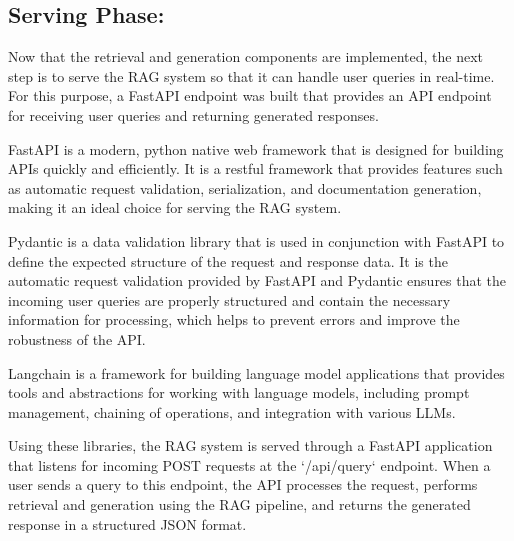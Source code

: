 ﻿\documentclass{article}
\begin{document}
\subsection{Serving Phase:}

Now that the retrieval and generation components are implemented, 
the next step is to serve the RAG system so that it can handle user queries in real-time.
For this purpose, a FastAPI endpoint was built that provides an API endpoint for receiving user queries and returning generated responses.

FastAPI is a modern, python native web framework that is designed for building APIs quickly and efficiently.
It is a restful framework that provides features such as automatic request validation, serialization, and documentation generation, making it an ideal choice for serving the RAG system.

Pydantic is a data validation library that is used in conjunction with FastAPI to define the expected structure of the request and response data.
It is the automatic request validation provided by FastAPI and Pydantic ensures that the incoming user queries are properly structured and contain the necessary information for processing, which helps to prevent errors and improve the robustness of the API.

Langchain is a framework for building language model applications that provides tools and abstractions for working with language models, including prompt management, chaining of operations, and integration with various LLMs.

Using these libraries, the RAG system is served through a FastAPI application that listens for incoming POST requests at the `/api/query` endpoint.
When a user sends a query to this endpoint, the API processes the request, performs retrieval and generation using the RAG pipeline, and returns the generated response in a structured JSON format.
\end{document}
